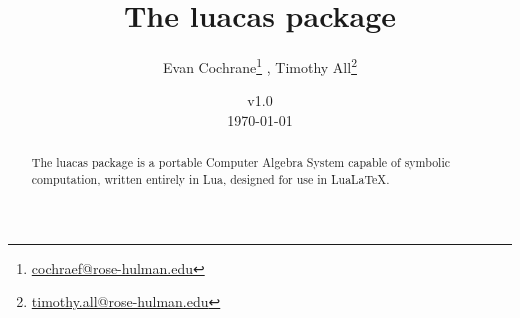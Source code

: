 \documentclass{article}
\begin{document}
\title{The {\ttfamily luacas} package}
\author{Evan Cochrane\thanks{\href{mailto:cochraef@rose-hulman.edu}{\ttfamily cochraef@rose-hulman.edu}} , Timothy All\thanks{\href{mailto:timothy.all@rose-hulman.edu}{\ttfamily timothy.all@rose-hulman.edu}}}
\date{v1.0 \\ \today} 

\maketitle 

\begin{abstract}
    The {\ttfamily luacas} package is a portable Computer Algebra System capable of symbolic computation, written entirely in Lua, designed for use in Lua\LaTeX{}.
\end{abstract}

\tableofcontents

















 

 













\appendix



\newpage

\printindex
\end{document}
